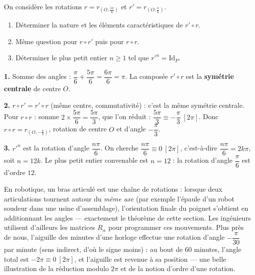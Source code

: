 \documentclass[11pt]{article}
\begin{document}
\begin{exercice}
On considère les rotations $r = r_{\left(O,\frac{5\pi}{6}\right)}$ et $r' = r_{\left(O,\frac{\pi}{6}\right)}$.
\begin{enumerate}
\item Déterminer la nature et les éléments caractéristiques de $r' \circ r$.
\item Même question pour $r \circ r'$ puis pour $r \circ r$.
\item Déterminer le plus petit entier $n \geq 1$ tel que $r'^n = \mathrm{Id}_P$.
\end{enumerate}
\end{exercice}

\begin{corrige}[Exercice 1]
\textbf{1.} Somme des angles : $\dfrac{\pi}{6}+\dfrac{5\pi}{6} = \dfrac{6\pi}{6} = \pi$. La composée $r' \circ r$ est la \textbf{symétrie centrale} de centre $O$.

\textbf{2.} $r \circ r' = r' \circ r$ (même centre, commutativité) : c'est la même symétrie centrale. Pour $r \circ r$ : somme $2 \times \dfrac{5\pi}{6} = \dfrac{5\pi}{3}$, que l'on réduit : $\dfrac{5\pi}{3} \equiv -\dfrac{\pi}{3} \ [2\pi]$. Donc $r \circ r = r_{\left(O,-\frac{\pi}{3}\right)}$, rotation de centre $O$ et d'angle $-\dfrac{\pi}{3}$.

\textbf{3.} $r'^n$ est la rotation d'angle $\dfrac{n\pi}{6}$. On cherche $\dfrac{n\pi}{6} \equiv 0 \ [2\pi]$, c'est-à-dire $\dfrac{n\pi}{6} = 2k\pi$, soit $n = 12k$. Le plus petit entier convenable est $n = 12$ : la rotation d'angle $\dfrac{\pi}{6}$ est d'ordre $12$.
\end{corrige}

\begin{savaistu}
En robotique, un bras articulé est une chaîne de rotations : lorsque deux articulations tournent autour du \emph{même axe} (par exemple l'épaule d'un robot soudeur dans une usine d'assemblage), l'orientation finale du poignet s'obtient en additionnant les angles — exactement le théorème de cette section. Les ingénieurs utilisent d'ailleurs les matrices $R_\alpha$ pour programmer ces mouvements. Plus près de nous, l'aiguille des minutes d'une horloge effectue une rotation d'angle $-\dfrac{\pi}{30}$ par minute (sens indirect, d'où le signe moins) : au bout de $60$ minutes, l'angle total est $-2\pi \equiv 0 \ [2\pi]$, et l'aiguille est revenue à sa position — une belle illustration de la réduction modulo $2\pi$ et de la notion d'ordre d'une rotation.
\end{savaistu}
\end{document}

